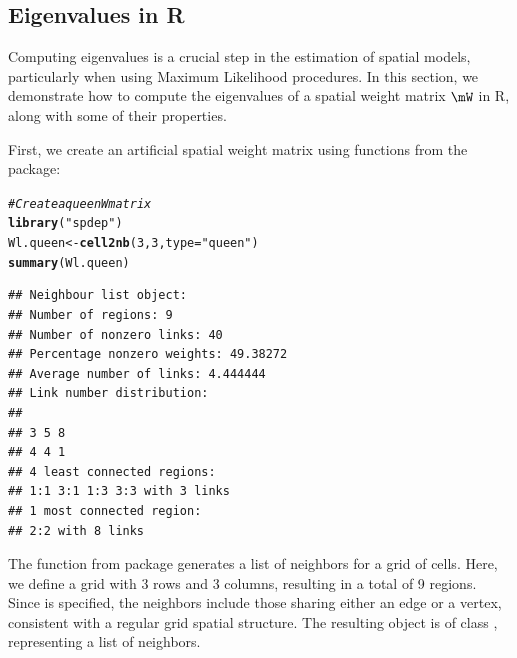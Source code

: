\documentclass[english,12pt]{book}\usepackage[]{graphicx}\usepackage[]{xcolor}
\makeatletter
\newcommand{\hlnum}[1]{\textcolor[rgb]{0.686,0.059,0.569}{#1}}%
\newcommand{\hlstr}[1]{\textcolor[rgb]{0.192,0.494,0.8}{#1}}%
\newcommand{\hlcom}[1]{\textcolor[rgb]{0.678,0.584,0.686}{\textit{#1}}}%
\newcommand{\hlstd}[1]{\textcolor[rgb]{0.345,0.345,0.345}{#1}}%
\newcommand{\hlkwb}[1]{\textcolor[rgb]{0.69,0.353,0.396}{#1}}%
\newcommand{\hlkwc}[1]{\textcolor[rgb]{0.333,0.667,0.333}{#1}}%
\newcommand{\hlkwd}[1]{\textcolor[rgb]{0.737,0.353,0.396}{\textbf{#1}}}%
\newenvironment{kframe}{%
 \def\at@end@of@kframe{}%
 \ifinner\ifhmode%
  \def\at@end@of@kframe{\end{minipage}}%
  \begin{minipage}{\columnwidth}%
 \fi\fi%
 \def\FrameCommand##1{\hskip\@totalleftmargin \hskip-\fboxsep
 \colorbox{shadecolor}{##1}\hskip-\fboxsep
     \hskip-\linewidth \hskip-\@totalleftmargin \hskip\columnwidth}%
 \MakeFramed {\advance\hsize-\width
   \@totalleftmargin\z@ \linewidth\hsize
   \@setminipage}}%
 {\par\unskip\endMakeFramed%
 \at@end@of@kframe}
\newenvironment{knitrout}{}{} %
\makeatother
\begin{document}
\subsection{Eigenvalues in R}

Computing eigenvalues is a crucial step in the estimation of spatial models, particularly when using Maximum Likelihood procedures. In this section, we demonstrate how to compute the eigenvalues of a spatial weight matrix $\mW$ in R, along with some of their properties.

First, we create an artificial spatial weight matrix using functions from the  package:

\begin{knitrout}
\color{fgcolor}\begin{kframe}
\begin{alltt}
\hlcom{# Create a queen W matrix}
\hlkwd{library}\hlstd{(}\hlstr{"spdep"}\hlstd{)}
\hlstd{Wl.queen} \hlkwb{<-} \hlkwd{cell2nb}\hlstd{(}\hlnum{3}\hlstd{,} \hlnum{3}\hlstd{,} \hlkwc{type} \hlstd{=} \hlstr{"queen"}\hlstd{)}
\hlkwd{summary}\hlstd{(Wl.queen)}
\end{alltt}
\begin{verbatim}
## Neighbour list object:
## Number of regions: 9 
## Number of nonzero links: 40 
## Percentage nonzero weights: 49.38272 
## Average number of links: 4.444444 
## Link number distribution:
## 
## 3 5 8 
## 4 4 1 
## 4 least connected regions:
## 1:1 3:1 1:3 3:3 with 3 links
## 1 most connected region:
## 2:2 with 8 links
\end{verbatim}
\end{kframe}
\end{knitrout}

The function  from  package generates a list of neighbors for a grid of cells. Here, we define a grid with 3 rows and 3 columns, resulting in a total of 9 regions. Since  is specified, the neighbors include those sharing either an edge or a vertex, consistent with a regular grid spatial structure. The resulting object is of class , representing a list of neighbors.
\end{document}
